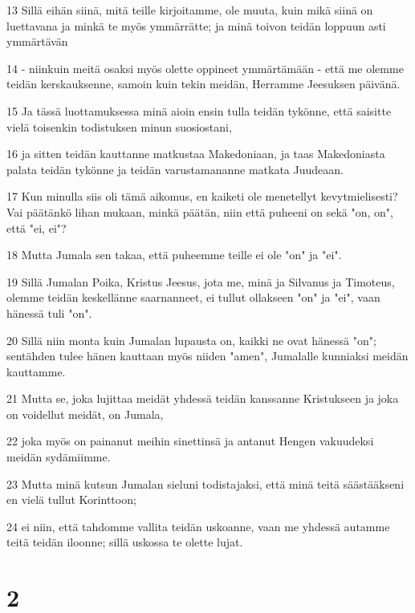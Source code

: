 \par 13 Sillä eihän siinä, mitä teille kirjoitamme, ole muuta, kuin mikä siinä on luettavana ja minkä te myös ymmärrätte; ja minä toivon teidän loppuun asti ymmärtävän
\par 14 - niinkuin meitä osaksi myös olette oppineet ymmärtämään - että me olemme teidän kerskauksenne, samoin kuin tekin meidän, Herramme Jeesuksen päivänä.
\par 15 Ja tässä luottamuksessa minä aioin ensin tulla teidän tykönne, että saisitte vielä toisenkin todistuksen minun suosiostani,
\par 16 ja sitten teidän kauttanne matkustaa Makedoniaan, ja taas Makedoniasta palata teidän tykönne ja teidän varustamananne matkata Juudeaan.
\par 17 Kun minulla siis oli tämä aikomus, en kaiketi ole menetellyt kevytmielisesti? Vai päätänkö lihan mukaan, minkä päätän, niin että puheeni on sekä "on, on", että "ei, ei"?
\par 18 Mutta Jumala sen takaa, että puheemme teille ei ole "on" ja "ei".
\par 19 Sillä Jumalan Poika, Kristus Jeesus, jota me, minä ja Silvanus ja Timoteus, olemme teidän keskellänne saarnanneet, ei tullut ollakseen "on" ja "ei", vaan hänessä tuli "on".
\par 20 Sillä niin monta kuin Jumalan lupausta on, kaikki ne ovat hänessä "on"; sentähden tulee hänen kauttaan myös niiden "amen", Jumalalle kunniaksi meidän kauttamme.
\par 21 Mutta se, joka lujittaa meidät yhdessä teidän kanssanne Kristukseen ja joka on voidellut meidät, on Jumala,
\par 22 joka myös on painanut meihin sinettinsä ja antanut Hengen vakuudeksi meidän sydämiimme.
\par 23 Mutta minä kutsun Jumalan sieluni todistajaksi, että minä teitä säästääkseni en vielä tullut Korinttoon;
\par 24 ei niin, että tahdomme vallita teidän uskoanne, vaan me yhdessä autamme teitä teidän iloonne; sillä uskossa te olette lujat.

\chapter{2}

